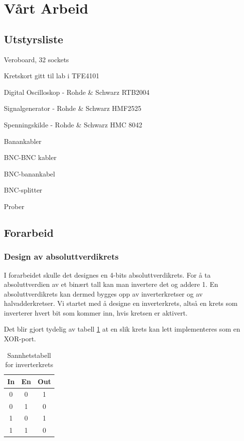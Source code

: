 \section{Vårt Arbeid}

\subsection{Utstyrsliste} %

Veroboard, 32 sockets

Kretskort gitt til lab i TFE4101

Digital Oscilloskop - Rohde \& Schwarz RTB2004

Signalgenerator - Rohde \& Schwarz HMF2525

Spenningskilde - Rohde \& Schwarz HMC 8042

Banankabler

BNC-BNC kabler

BNC-banankabel

BNC-splitter

Prober

\subsection{Forarbeid}

\subsubsection*{Design av absoluttverdikrets}

I forarbeidet skulle det designes en 4-bits absoluttverdikrets.
For å ta absoluttverdien av et binært tall kan man invertere det og addere 1.
En absoluttverdikrets kan dermed bygges opp av inverterkretser og av halvadderkretser.
Vi startet med å designe en inverterkrets, altså en krets som inverterer hvert bit som kommer inn, hvis kretsen er aktivert.

Det blir gjort tydelig av tabell \ref{tabell:1} at en slik krets kan lett implementeres som en XOR-port.

\begin{table}[h]
  \centering
  \begin{tabular}{c c|c}

    In & En & Out\\
    \hline
    0 & 0 & 1\\
    0 & 1 & 0\\
    1 & 0 & 1\\
    1 & 1 & 0\\

  \end{tabular}
  \caption{Sannhetstabell for inverterkrets}
  \label{tabell:1}
\end{table}

